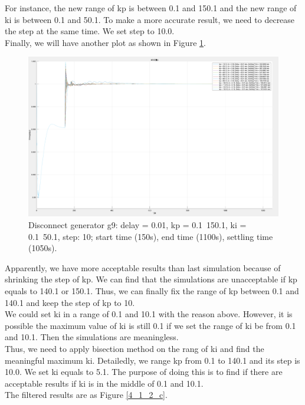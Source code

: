 \documentclass{report}
\begin{document}
For instance, the new range of kp is between 0.1 and 150.1 and the new range of ki is between 0.1 and 50.1. To make a more accurate result, we need to decrease the step at the same time. We set step to 10.0. \\

Finally, we will have another plot as shown in Figure \textcolor{red}{\ref{4_1_2_b}}. \\

\begin{figure}[htbp]
\centering
\includegraphics[width = .819\textwidth]{figure/4_1_2_b.png}
\caption{Disconnect generator g9: delay = 0.01, kp = 0.1~150.1, ki = 0.1~50.1, step: 10; start time (150s), end time (1100s), settling time (1050s).}
\label{4_1_2_b}
\end{figure}


Apparently, we have more acceptable results than last simulation because of shrinking the step of kp. We can find that the simulations are unacceptable if kp equals to 140.1 or 150.1. Thus, we can finally fix the range of kp between 0.1 and 140.1 and keep the step of kp to 10. \\

We could set ki in a range of 0.1 and 10.1 with the reason above. However, it is possible the maximum value of ki is still 0.1 if we set the range of ki be from 0.1 and 10.1. Then the simulations are meaningless. \\

Thus, we need to apply bisection method on the rang of ki and find the meaningful maximum ki. Detailedly, we range kp from 0.1 to 140.1 and its step is 10.0. We set ki equals to 5.1. The purpose of doing this is to find if there are acceptable results if ki is in the middle of 0.1 and 10.1.\\   

The filtered results are as Figure \textcolor{red}{\ref{4_1_2_c}}. \\
\end{document}
